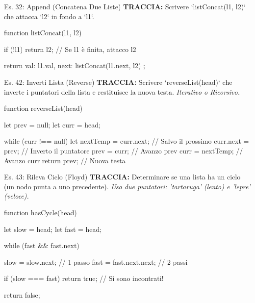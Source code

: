\begin{esercizio}{Es. 32: Append (Concatena Due Liste)}
\textbf{TRACCIA:} Scrivere `listConcat(l1, l2)` che attacca `l2` in fondo a `l1`.
\end{esercizio}

\begin{jsbox}
function listConcat(l1, l2) {
    if (!l1) return l2; // Se l1 è finita, attacco l2
    
    return {
        val: l1.val,
        next: listConcat(l1.next, l2)
    };
}
\end{jsbox}

\begin{esercizio}{Es. 42: Inverti Lista (Reverse)}
\textbf{TRACCIA:} Scrivere `reverseList(head)` che inverte i puntatori della lista e restituisce la nuova testa.
\textit{Iterativo o Ricorsivo.}
\end{esercizio}

\begin{jsbox}
function reverseList(head) {
    let prev = null;
    let curr = head;
    
    while (curr !== null) {
        let nextTemp = curr.next; // Salvo il prossimo
        curr.next = prev;         // Inverto il puntatore
        prev = curr;              // Avanzo prev
        curr = nextTemp;          // Avanzo curr
    }
    return prev; // Nuova testa
}
\end{jsbox}

\begin{esercizio}{Es. 43: Rileva Ciclo (Floyd)}
\textbf{TRACCIA:} Determinare se una lista ha un ciclo (un nodo punta a uno precedente).
\textit{Usa due puntatori: 'tartaruga' (lento) e 'lepre' (veloce).}
\end{esercizio}

\begin{jsbox}
function hasCycle(head) {
    let slow = head;
    let fast = head;
    
    while (fast && fast.next) {
        slow = slow.next;       // 1 passo
        fast = fast.next.next;  // 2 passi
        
        if (slow === fast) return true; // Si sono incontrati!
    }
    return false;
}
\end{jsbox}
